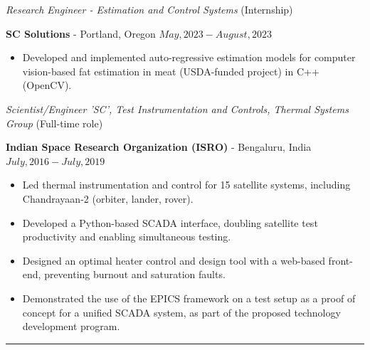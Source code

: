 \medskip

\noindent\textit{Research Engineer  - Estimation and Control Systems} (Internship)

\textbf{SC Solutions} - Portland, Oregon \hfill $May, 2023 - August, 2023$

\begin{itemize}
    \item Developed and implemented auto-regressive estimation models for computer vision-based fat estimation in meat (USDA-funded project) in C++ (OpenCV).
\end{itemize}

\medskip

\noindent\textit{Scientist/Engineer 'SC', Test Instrumentation and Controls, Thermal Systems Group} (Full-time role)

\textbf{Indian Space Research Organization (ISRO)} - Bengaluru, India \hfill $July, 2016 - July, 2019$

\begin{itemize}
        \item Led thermal instrumentation and control for 15 satellite systems, including Chandrayaan-2 (orbiter, lander, rover).
        \item Developed a Python-based SCADA interface, doubling satellite test productivity and enabling simultaneous testing.
	\item Designed an optimal heater control and design tool with a web-based front-end, preventing burnout and saturation faults.
        \item Demonstrated the use of the EPICS framework on a test setup as a proof of concept for a unified SCADA
                system, as part of the proposed technology development program.
\end{itemize}
\noindent\rule{\textwidth}{0.4pt}
